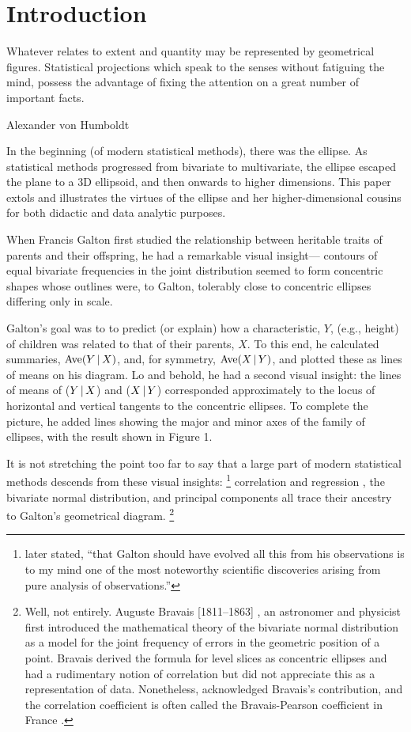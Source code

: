 \section{Introduction}

\epigraph{Whatever relates to extent and quantity may be represented by
geometrical figures. Statistical projections which speak to the senses without
fatiguing the mind, possess the advantage of fixing the attention on a great
number of important facts.}{Alexander von Humboldt \citeyearpar[p.~ciii]{Humboldt:1811a}}

In the beginning (of modern  statistical methods), there was the  ellipse. As statistical
methods progressed from bivariate to multivariate, the ellipse escaped the plane to a 3D
ellipsoid, and then onwards to higher dimensions.
This  paper extols and illustrates the
virtues of the ellipse and her higher-dimensional cousins for both didactic and
data analytic purposes.

When
Francis Galton  \citeyearpar{Galton:1886} first  studied the  relationship between  heritable traits of
parents and their offspring, he  had a remarkable visual insight--- contours of
equal bivariate frequencies in the joint distribution seemed to form  concentric
shapes whose outlines  were, to Galton,  tolerably close to  concentric ellipses
differing only in scale.

Galton's goal was to  to predict (or explain)  how a characteristic, $Y$,   (e.g.,
height) of children was  related to that of  their parents, $X$.  To  this end, he
calculated summaries,  $\mathrm{Ave}(Y\, | \, X)$,  and, for  symmetry, $\mathrm{Ave}(X\, | \, Y)$, and plotted
these as lines of means on his  diagram.  Lo and behold, he had a  second visual
insight:  the lines  of means of  ($Y\, | \, X$) and ($X\, | \, Y$)  corresponded approximately to
the locus of  horizontal and vertical  tangents to the  concentric ellipses.  To
complete the picture,  he added lines  showing the major  and minor axes  of the
family of ellipses, with the result shown in Figure 1.

It is  not stretching  the point  too far  to say  that a  large part  of modern
statistical  methods  descends  from  these  visual  insights:%
\footnote{\citet[p. 37]{Pearson:1920} later stated, ``that Galton
should have evolved all this from his observations is to my mind one
of the most noteworthy scientific discoveries arising from pure
analysis of observations.'' }
correlation   and
regression \citep{Pearson:1896}, the  bivariate normal  distribution,
and principal components  \citep{Pearson:1901,Hotelling:1933}  all trace their ancestry to Galton's  geometrical
diagram.%
\footnote{
Well, not entirely. Auguste Bravais [1811--1863] \citeyearpar{Bravais:1846}, an astronomer
and physicist first introduced the mathematical theory of the bivariate normal distribution
as a model for the joint frequency of errors in the geometric position of a point.
Bravais derived the formula for level slices as concentric ellipses and had a rudimentary
notion of correlation but did not appreciate this as a representation of data.
Nonetheless, \cite{Pearson:1920} acknowledged Bravais's contribution, and the correlation
coefficient is often called the Bravais-Pearson coefficient in France
\citep{Denis:2001}. }


